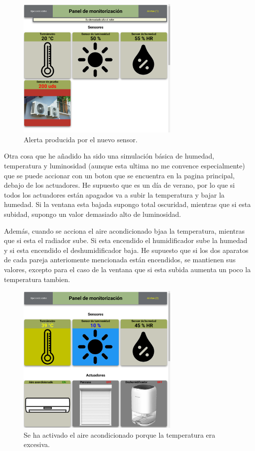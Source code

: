 \documentclass{article}
\begin{document}
\begin{figure}[H]
    \centering
    \includegraphics[width=0.7\textwidth]{images/nuevosensoralerta.png}
    \caption{Alerta producida por el nuevo sensor.}
\end{figure}

Otra cosa que he añadido ha sido una simulación básica de humedad, temperatura y luminosidad (aunque esta ultima no me convence especialmente) que se puede accionar con un boton que se encuentra en la pagina principal, debajo de los actuadores. He supuesto que es un día de verano, por lo que si todos los actuadores están apagados va a subir la temperatura y bajar la humedad. Si la ventana esta bajada supongo total oscuridad, mientras que si esta subidad, supongo un valor demasiado alto de luminosidad.

Además, cuando se acciona el aire acondicionado bjaa la temperatura, mientras que si esta el radiador sube. Si esta encendido el humidificador sube la humedad y si esta encendido el deshumidificador baja. He supuesto que si los dos aparatos de cada pareja anteriomente mencionada están encendidos, se mantienen sus valores, excepto para el caso de la ventana que si esta subida aumenta un poco la temperatura tambien.

\begin{figure}[H]
    \centering
    \includegraphics[width=0.7\textwidth]{images/sim.png}
    \caption{Se ha activado el aire acondicionado porque la temperatura era excesiva.}
\end{figure}
\end{document}
